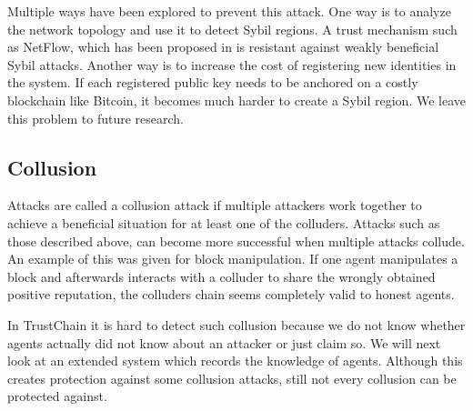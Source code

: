 Multiple ways have been explored to prevent this attack. One way is to analyze the network topology
and use it to detect Sybil regions. A trust mechanism such as NetFlow, which has been proposed in 
\cite{OTTE2017} is resistant against weakly beneficial Sybil attacks. Another way is to increase the cost of 
registering new identities in the system. If each registered public key needs to be anchored on a 
costly blockchain like Bitcoin, it becomes much harder to create a Sybil region. We leave this problem
to future research.

\subsection{Collusion}
\label{sec:collusion}
Attacks are called a collusion attack if multiple attackers work together to achieve a beneficial
situation for at least one of the colluders. Attacks such as those described above, 
can become more successful when multiple attacks collude. An example of this was given for block 
manipulation. If one agent manipulates a block and afterwards interacts with a colluder to share the
wrongly obtained positive reputation, the colluders chain seems completely valid to honest agents.

In TrustChain it is hard to detect such collusion because we do not know whether agents actually 
did not know about an attacker or just claim so. We will next look at an extended system which 
records the knowledge of agents. Although this creates protection against some collusion attacks, 
still not every collusion can be protected against.

